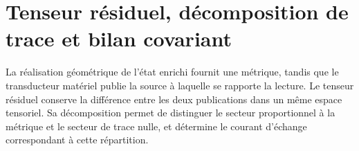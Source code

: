 

%

\chapter{Tenseur résiduel, décomposition de trace et bilan covariant}
\label{x_reciprocidad:vii:sec:tensor-residual-balance}

La réalisation géométrique de l'état enrichi fournit une métrique, tandis que le transducteur matériel publie la source à laquelle se rapporte la lecture. Le tenseur résiduel conserve la différence entre les deux publications dans un même espace tensoriel. Sa décomposition permet de distinguer le secteur proportionnel à la métrique et le secteur de trace nulle, et détermine le courant d'échange correspondant à cette répartition.

